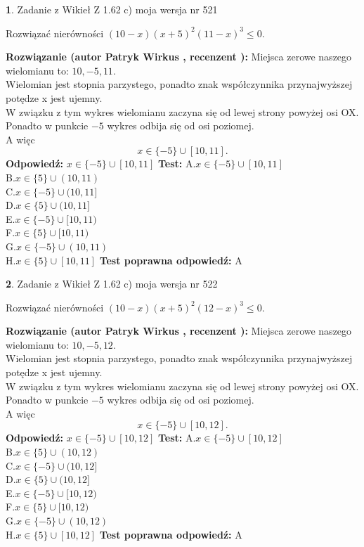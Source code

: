 \documentclass[12pt, a4paper]{article}
\theoremstyle{definition} %
\newtheorem{zad}{}
\newcommand{\zadStart}[1]{\begin{zad}#1\newline}
\newcommand{\zadStop}{\end{zad}}
\newcommand{\rozwStart}[2]{\noindent \textbf{Rozwiązanie (autor #1 , recenzent #2): }\newline}
\newcommand{\rozwStop}{\newline}
\newcommand{\odpStart}{\noindent \textbf{Odpowiedź:}\newline}
\newcommand{\odpStop}{\newline}
\newcommand{\testStart}{\noindent \textbf{Test:}\newline}
\newcommand{\testStop}{\newline}
\newcommand{\kluczStart}{\noindent \textbf{Test poprawna odpowiedź:}\newline}
\newcommand{\kluczStop}{\newline}
\begin{document}
\zadStart{Zadanie z Wikieł Z 1.62 c) moja wersja nr 521}

Rozwiązać nierówności $(10-x)(x+5)^{2}(11-x)^{3}\le0$.
\zadStop
\rozwStart{Patryk Wirkus}{}
Miejsca zerowe naszego wielomianu to: $10, -5, 11$.\\
Wielomian jest stopnia parzystego, ponadto znak współczynnika przy\linebreak najwyższej potędze x jest ujemny.\\ W związku z tym wykres wielomianu zaczyna się od lewej strony powyżej osi OX.\\
Ponadto w punkcie $-5$ wykres odbija się od osi poziomej.\\
A więc $$x \in \{-5\} \cup [10,11].$$
\rozwStop
\odpStart
$x \in \{-5\} \cup [10,11]$
\odpStop
\testStart
A.$x \in \{-5\} \cup [10,11]$\\
B.$x \in \{5\} \cup (10,11)$\\
C.$x \in \{-5\} \cup (10,11]$\\
D.$x \in \{5\} \cup (10,11]$\\
E.$x \in \{-5\} \cup [10,11)$\\
F.$x \in \{5\} \cup [10,11)$\\
G.$x \in \{-5\} \cup (10,11)$\\
H.$x \in \{5\} \cup [10,11]$
\testStop
\kluczStart
A
\kluczStop



\zadStart{Zadanie z Wikieł Z 1.62 c) moja wersja nr 522}

Rozwiązać nierówności $(10-x)(x+5)^{2}(12-x)^{3}\le0$.
\zadStop
\rozwStart{Patryk Wirkus}{}
Miejsca zerowe naszego wielomianu to: $10, -5, 12$.\\
Wielomian jest stopnia parzystego, ponadto znak współczynnika przy\linebreak najwyższej potędze x jest ujemny.\\ W związku z tym wykres wielomianu zaczyna się od lewej strony powyżej osi OX.\\
Ponadto w punkcie $-5$ wykres odbija się od osi poziomej.\\
A więc $$x \in \{-5\} \cup [10,12].$$
\rozwStop
\odpStart
$x \in \{-5\} \cup [10,12]$
\odpStop
\testStart
A.$x \in \{-5\} \cup [10,12]$\\
B.$x \in \{5\} \cup (10,12)$\\
C.$x \in \{-5\} \cup (10,12]$\\
D.$x \in \{5\} \cup (10,12]$\\
E.$x \in \{-5\} \cup [10,12)$\\
F.$x \in \{5\} \cup [10,12)$\\
G.$x \in \{-5\} \cup (10,12)$\\
H.$x \in \{5\} \cup [10,12]$
\testStop
\kluczStart
A
\kluczStop
\end{document}
